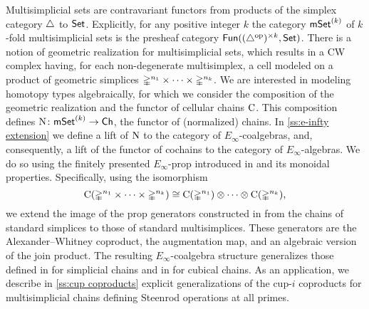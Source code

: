 Multisimplicial sets are contravariant functors from products of the simplex category $\triangle$ to $\mathsf{Set}$.
Explicitly, for any positive integer $k$ the category $\mathsf{mSet}^{(k)}$ of $k$-fold multisimplicial sets is the presheaf category $\mathsf{Fun}((\triangle^{\mathrm{op}})^{\times k}, \mathsf{Set})$.
There is a notion of geometric realization for multisimplicial sets, which results in a CW complex having, for each non-degenerate multisimplex, a cell modeled on a product of geometric simplices $\mathbb{\Delta}^{n_1}\times\dots\times\mathbb{\Delta}^{n_k}$.
We are interested in modeling homotopy types algebraically, for which we consider the composition of the geometric realization and the functor of cellular chains $\operatorname{C}$.
This composition defines $\operatorname{N} \colon \mathsf{mSet}^{(k)} \to \mathsf{Ch}$, the functor of (normalized) chains.
In \cref{ss:e-infty extension} we define a lift of $\operatorname{N}$ to the category of $E_\infty$-coalgebras, and, consequently, a lift of the functor of cochains to the category of $E_\infty$-algebras.
We do so using the finitely presented $E_\infty$-prop introduced in \cite{medina2020prop1} and its monoidal properties.
Specifically, using the isomorphism
\[
\operatorname{C}(\mathbb{\Delta}^{n_1}\times\dots\times\mathbb{\Delta}^{n_k}) \cong
\operatorname{C}(\mathbb{\Delta}^{n_1}) \otimes\dotsb\otimes \operatorname{C}(\mathbb{\Delta}^{n_k}),
\]
we extend the image of the prop generators constructed in \cite{medina2020prop1} from the chains of standard simplices to those of standard multisimplices.
These generators are the Alexander--Whitney coproduct, the augmentation map, and an algebraic version of the join product.
The resulting $E_\infty$-coalgebra structure generalizes those defined in \cite{mcclure2003multivariable, berger2004combinatorial, medina2020prop1} for simplicial chains and in \cite{medina2022cube_einfty} for cubical chains.
As an application, we describe in \cref{ss:cup coproducts} explicit generalizations of the cup-$i$ coproducts for multisimplicial chains defining Steenrod operations at all primes.

